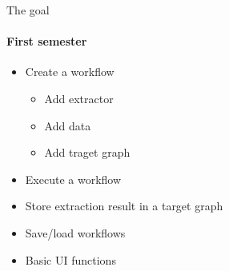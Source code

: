 \begin{frame}{The goal}
\framesubtitle{First semester}
	\begin{itemize}
		\item Create a workflow
		\begin{itemize}
			\item Add extractor
			\item Add data
			\item Add traget graph
		\end{itemize}
		\item Execute a workflow
		\item Store extraction result in a target graph
		\item Save/load workflows
		\item Basic UI functions
	\end{itemize}
\end{frame}